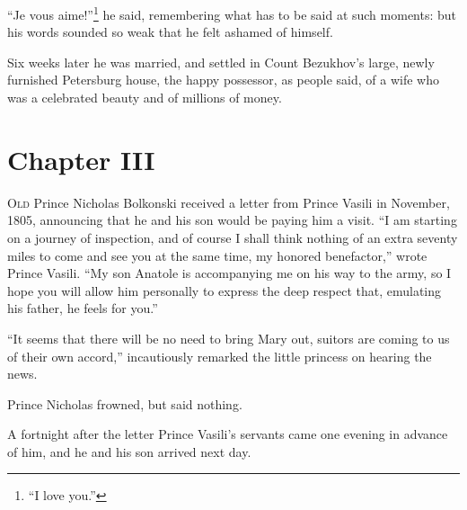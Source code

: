 ``Je vous aime!''\footnote{``I love you.''} he said, remembering
what has to be said at such moments: but his words sounded so
weak that he felt ashamed of himself.

Six weeks later he was married, and settled in Count Bezukhov's
large, newly furnished Petersburg house, the happy possessor, as
people said, of a wife who was a celebrated beauty and of
millions of money.


\chapter*{Chapter III}
\ifaudio     
{} 
\fi

\lettrine[lines=2, loversize=0.3, lraise=0]{\initfamily O}{ld}
 Prince Nicholas Bolkonski received a letter from Prince
Vasili in November, 1805, announcing that he and his son would be
paying him a visit. ``I am starting on a journey of inspection,
and of course I shall think nothing of an extra seventy miles to
come and see you at the same time, my honored benefactor,'' wrote
Prince Vasili. ``My son Anatole is accompanying me on his way to
the army, so I hope you will allow him personally to express the
deep respect that, emulating his father, he feels for you.''

``It seems that there will be no need to bring Mary out, suitors
are coming to us of their own accord,'' incautiously remarked the
little princess on hearing the news.

Prince Nicholas frowned, but said nothing.

A fortnight after the letter Prince Vasili's servants came one
evening in advance of him, and he and his son arrived next day.

